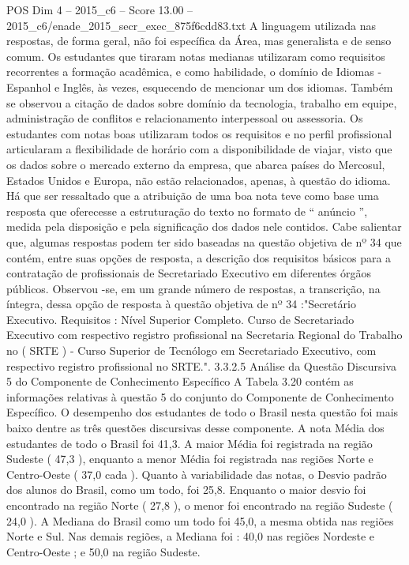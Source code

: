\begin{textsample}{POS Dim 4 – 2015\_c6 – Score 13.00 – 2015\_c6/enade\_2015\_secr\_exec\_875f6cdd83.txt}
A linguagem utilizada nas respostas, de forma geral, não foi específica da Área, mas generalista e de senso comum.
Os estudantes que tiraram notas medianas utilizaram como requisitos recorrentes a formação acadêmica, e como habilidade, o domínio de Idiomas - Espanhol e Inglês, às vezes, esquecendo de mencionar um dos idiomas.
Também se observou a citação de dados sobre domínio da tecnologia, trabalho em equipe, administração de conflitos e relacionamento interpessoal ou assessoria.
Os estudantes com notas boas utilizaram todos os requisitos e no perfil profissional articularam a flexibilidade de horário com a disponibilidade de viajar, visto que os dados sobre o mercado externo da empresa, que abarca países do Mercosul, Estados Unidos e Europa, não estão relacionados, apenas, à questão do idioma.
Há que ser ressaltado que a atribuição de uma boa nota teve como base uma resposta que oferecesse a estruturação do texto no formato de “ anúncio ”, medida pela disposição e pela significação dos dados nele contidos.
Cabe salientar que, algumas respostas podem ter sido baseadas na questão objetiva de nº 34 que contém, entre suas opções de resposta, a descrição dos requisitos básicos para a contratação de profissionais de Secretariado Executivo em diferentes órgãos públicos.
Observou -se, em um grande número de respostas, a transcrição, na íntegra, dessa opção de resposta à questão objetiva de nº 34 :"Secretário Executivo.
Requisitos : Nível Superior Completo.
Curso de Secretariado Executivo com respectivo registro profissional na Secretaria Regional do Trabalho no ( SRTE ) - Curso Superior de Tecnólogo em Secretariado Executivo, com respectivo registro profissional no SRTE.". 3.3.2.5 Análise da Questão Discursiva 5 do Componente de Conhecimento Específico A Tabela 3.20 contém as informações relativas à questão 5 do conjunto do Componente de Conhecimento Específico.
O desempenho dos estudantes de todo o Brasil nesta questão foi mais baixo dentre as três questões discursivas desse componente.
A nota Média dos estudantes de todo o Brasil foi 41,3.
A maior Média foi registrada na região Sudeste ( 47,3 ), enquanto a menor Média foi registrada nas regiões Norte e Centro-Oeste ( 37,0 cada ).
Quanto à variabilidade das notas, o Desvio padrão dos alunos do Brasil, como um todo, foi 25,8.
Enquanto o maior desvio foi encontrado na região Norte ( 27,8 ), o menor foi encontrado na região Sudeste ( 24,0 ).
A Mediana do Brasil como um todo foi 45,0, a mesma obtida nas regiões Norte e Sul.
Nas demais regiões, a Mediana foi : 40,0 nas regiões Nordeste e Centro-Oeste ; e 50,0 na região Sudeste.

\end{textsample}
